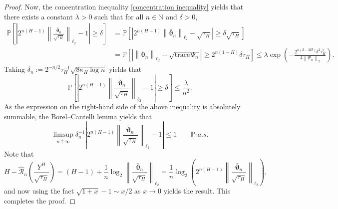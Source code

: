\documentclass[12pt,reqno]{article}
\def\trace#1{\text{trace}\, #1}
\newcommand{\norm}[1]{\left\lVert {#1}\right\rVert}
\def\ua{\uparrow}
\def\wh{\widehat}
\numberwithin{equation}{section}
\def\cR{{\mathscr R}}
\theoremstyle{definition}
\def\ua{\uparrow}
\def\wh{\widehat}
\newcommand{\bN}{\mathbb{N}}
\newcommand{\bP}{\mathbb{P}}
\begin{document}
\begin{proof}
	Now, the concentration inequality \eqref{concentration inequality} yields that there exists a constant $\lambda > 0$ such that for all $n \in \bN$ and $\delta > 0$, 
	\begin{equation*}
		\begin{split}
			\bP\left[\left|2^{n(H-1)}\norm{\frac{\bar{\bm \vartheta}_n}{\sqrt{\tau_H}}}_{\ell_2} - 1\right|\ge \delta \right] &= \bP\left[\left|2^{n(H-1)}\norm{\bar{\bm \vartheta}_n}_{\ell_2} - \sqrt{\tau_H}\right|\ge \delta\sqrt{\tau_H} \right] \\&= \bP\left[\left|\norm{\bar{\bm \vartheta}_n}_{\ell_2} - \sqrt{\trace \Psi_n}\right|\ge 2^{n(1-H)}\delta\tau_H \right] \le \lambda \exp\left(-\frac{2^{n(2-2H)}\delta^2\tau^2_H}{4\norm{\Psi_n}_2}\right).
		\end{split}
	\end{equation*}
	Taking $\delta_n := 2^{-n/2}\tau^{-1}_H\sqrt{8\kappa_H\log n}$ yields that 
	\begin{equation*}
		\bP\left[\left|2^{n(H-1)}\norm{\frac{\bar{\bm \vartheta}_n}{\sqrt{\tau_H}}}_{\ell_2} - 1\right|\ge \delta \right]\le \frac{\lambda}{n^2}.
	\end{equation*}
	As the expression on the right-hand side of the above inequality is absolutely summable, the Borel--Cantelli lemma yields that 
	\begin{equation*}
		\limsup_{n \ua \infty}\delta_n^{-1}\left|2^{n(H-1)}\norm{\frac{\bar{\bm \vartheta}_n}{\sqrt{\tau_H}}}_{\ell_2} - 1\right| \le 1 \qquad \bP\text{-}a.s.
	\end{equation*}
	Note that\label{previous page 36}
	\begin{equation*}
		H - \wh \cR_n\left(\frac{Y^H}{\sqrt{\tau_H}}\right) = (H-1) + \frac{1}{n}\log_2\norm{\frac{\bar{\bm \vartheta}_n}{\sqrt{\tau_H}}}_{\ell_2} = \frac{1}{n}\log_2 \left(2^{n(H-1)}\norm{\frac{\bar{\bm \vartheta}_n}{\sqrt{\tau_H}}}_{\ell_2}\right),
	\end{equation*}
	and now using the fact $\sqrt{1 + x} - 1 \sim x/2$ as $x \rightarrow 0$ yields the result. This completes the proof. 
\end{proof}
\end{document}
